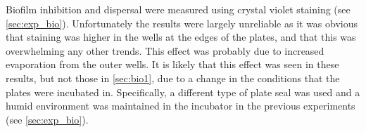 Biofilm inhibition and dispersal were measured using crystal violet staining  (see \ref{sec:exp_bio}). Unfortunately the results were largely unreliable as it was obvious that staining was higher in the wells at the edges of the plates, and that this was overwhelming any other trends. This effect was probably due to increased evaporation from the outer wells. 
It is likely that this effect was seen in these results, but not those in \ref{sec:bio1}, due to a change in the conditions that the plates were incubated in. Specifically, a different type of plate seal was used and a humid environment was maintained in the incubator in the previous experiments (see \ref{sec:exp_bio}).